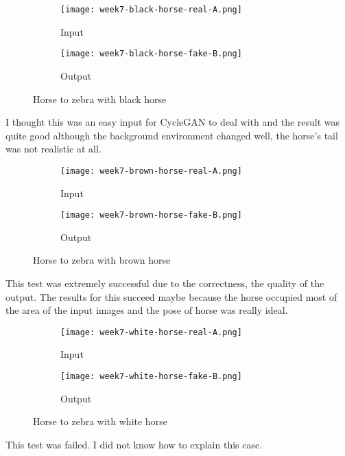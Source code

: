 \newpage
\begin{figure}[!ht]
\centering
\begin{subfigure}{0.5\textwidth}
  \centering
  \texttt{[image: week7-black-horse-real-A.png]}
  \caption{Input}
\end{subfigure}%
\begin{subfigure}{0.5\textwidth}
  \centering
  \texttt{[image: week7-black-horse-fake-B.png]}
  \caption{Output}
\end{subfigure}
\caption{Horse to zebra with black horse}
\end{figure}
I thought this was an easy input for CycleGAN to deal with and the result was quite good although the background environment changed well, the horse's tail was not realistic at all.

\begin{figure}[!ht]
\centering
\begin{subfigure}{0.5\textwidth}
  \centering
  \texttt{[image: week7-brown-horse-real-A.png]}
  \caption{Input}
\end{subfigure}%
\begin{subfigure}{0.5\textwidth}
  \centering
  \texttt{[image: week7-brown-horse-fake-B.png]}
  \caption{Output}
\end{subfigure}
\caption{Horse to zebra with brown horse}
\end{figure}
This test was extremely successful due to the correctness, the quality of the output. The results for this succeed maybe because the horse occupied most of the area of the input images and the pose of horse was really ideal.

\newpage
\begin{figure}[!ht]
\centering
\begin{subfigure}{0.5\textwidth}
  \centering
  \texttt{[image: week7-white-horse-real-A.png]}
  \caption{Input}
\end{subfigure}%
\begin{subfigure}{0.5\textwidth}
  \centering
  \texttt{[image: week7-white-horse-fake-B.png]}
  \caption{Output}
\end{subfigure}
\caption{Horse to zebra with white horse}
\end{figure}
This test was failed. I did not know how to explain this case.

